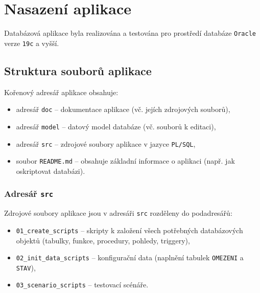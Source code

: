 \documentclass[
11pt,
a4paper,
pdftex,
czech,
titlepage
]{report}
\begin{document}
\chapter{Nasazení aplikace}\label{nasazeni}
Databázová aplikace byla realizována a testována pro prostředí databáze \texttt{Oracle} verze \texttt{19c} a vyšší.

\section{Struktura souborů aplikace}
Kořenový adresář aplikace obsahuje:
\begin{itemize}
    \item adresář \texttt{doc} -- dokumentace aplikace (vč. jejích zdrojových souborů),
    \item adresář \texttt{model} -- datový model databáze (vč. souborů k editaci),
    \item adresář \texttt{src} -- zdrojové soubory aplikace v jazyce \texttt{PL/SQL},
    \item soubor \texttt{README.md} -- obsahuje základní informace o aplikaci (např. jak oskriptovat databázi).
\end{itemize}

\subsection{Adresář \texttt{src}}
Zdrojové soubory aplikace jsou v adresáři \texttt{src} rozděleny do podadresářů:
\begin{itemize}
    \item \texttt{01\_create\_scripts} -- skripty k založení všech potřebných databázových objektů (tabulky, funkce, procedury, pohledy, triggery),
    \item \texttt{02\_init\_data\_scripts} -- konfigurační data (naplnění tabulek \texttt{OMEZENI} a \texttt{STAV}),
    \item \texttt{03\_scenario\_scripts} -- testovací scénáře.
\end{itemize}
\end{document}
